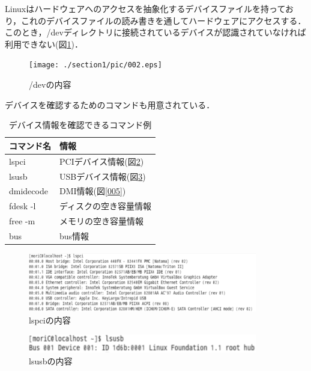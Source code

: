 Linuxはハードウェアへのアクセスを抽象化するデバイスファイルを持っており，これのデバイスファイルの読み書きを通してハードウェアにアクセスする．
このとき，/devディレクトリに接続されているデバイスが認識されていなければ利用できない(図\ref{002})．

\begin{figure}[!h]
	\begin{center}
		\texttt{[image: ./section1/pic/002.eps]}
		\caption{/devの内容}
		\label{002}
	\end{center}
\end{figure}

デバイスを確認するためのコマンドも用意されている．

\begin{table}[htb]
  \begin{center}
    \begin{tabular}{|l|l|} \hline
      コマンド名 & 情報 \\ \hline
      lspci & PCIデバイス情報(図\ref{003}) \\ \hline
      lsusb & USBデバイス情報(図\ref{004}) \\ \hline
      dmidecode & DMI情報(図\ref{005}) \\ \hline
      fdesk -l & ディスクの空き容量情報 \\ \hline
      free -m & メモリの空き容量情報 \\ \hline
      bus & bus情報 \\ \hline
    \end{tabular}
    \caption{デバイス情報を確認できるコマンド例}
  \end{center}
\end{table}

\begin{figure}[!h]
	\begin{center}
		\includegraphics[width=10cm]{./section1/pic/003.eps}
		\caption{lspciの内容}
		\label{003}
	\end{center}
\end{figure}

\begin{figure}[!h]
	\begin{center}
		\includegraphics[width=10cm]{./section1/pic/004.eps}
		\caption{lsusbの内容}
		\label{004}
	\end{center}
\end{figure}

